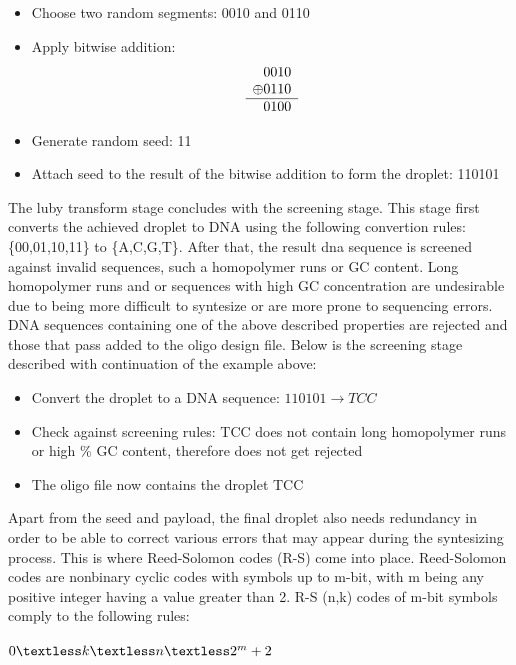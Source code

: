\documentclass[12pt]%
{article}
\begin{document}
\begin{itemize}
\item Choose two random segments: 0010 and 0110
\item Apply bitwise addition: \[
\begin{array}{c@{}c@{}c@{}c@{}c}
  & 0 & 0 & 1 & 0 \\
\oplus & 0 & 1 & 1 & 0 \\
\hline
  & 0 & 1 & 0 & 0 \\
\end{array}
\]
\item Generate random seed: 11
\item Attach seed to the result of the bitwise addition to form the droplet: 110101
\end{itemize}
The luby transform stage concludes with the screening stage. This stage first converts the achieved droplet to DNA using the following convertion rules: \{00,01,10,11\} to \{A,C,G,T\}. After that, the result dna sequence is screened against invalid sequences, such a homopolymer runs or GC content. Long homopolymer runs and or sequences with high GC concentration are undesirable \cite{erlich2017dna} due to being more difficult to syntesize or are more prone to sequencing errors. DNA sequences containing one of the above described properties are rejected and those that pass added to the oligo design file. Below is the screening stage described with continuation of the example above:

\begin{itemize}
\item Convert the droplet to a DNA sequence: $110101 \rightarrow TCC$
\item Check against screening rules: TCC does not contain long homopolymer runs or high \% GC content, therefore does not get rejected
\item The oligo file now contains the droplet TCC
\end{itemize}

Apart from the seed and payload, the final droplet also needs redundancy in order to be able to correct various errors that may appear during the syntesizing process. This is where Reed-Solomon codes (R-S) come into place. Reed-Solomon codes are nonbinary cyclic codes with symbols up to m-bit, with m being any positive integer having a value greater than 2. R-S (n,k) codes of m-bit symbols comply to the following rules:
\begin{center}

$0 \textless k \textless n \textless 2^m +2$

\end{center}
\end{document}
